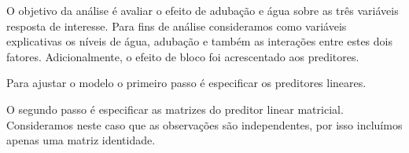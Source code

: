 \begin{knitrout}
\color{fgcolor}\begin{kframe}
\begin{alltt}
\hlstd{(}\hlstd{,}  \hlstd{=} \hlstd{)}
\end{alltt}
\end{kframe}
\end{knitrout}

O objetivo da análise é avaliar o efeito de adubação e água sobre as três variáveis resposta de interesse. Para fins de análise consideramos como variáveis explicativas os níveis de água, adubação e também as interações entre estes dois fatores. Adicionalmente, o efeito de bloco foi acrescentado aos preditores. 

Para ajustar o modelo o primeiro passo é especificar os preditores lineares.

\begin{knitrout}
\color{fgcolor}\begin{kframe}
\begin{alltt}
 \hlkwb{<-}  \hlopt{~}  \hlopt{+}  \hlopt{*} 
 \hlkwb{<-}  \hlopt{~}  \hlopt{+}  \hlopt{*} 

\hlopt{$} \hlkwb{<-} \hlopt{$} \hlopt{/} \hlopt{$}
 \hlkwb{<-}  \hlopt{~}  \hlopt{+}  \hlopt{*} 
\end{alltt}
\end{kframe}
\end{knitrout}

O segundo passo é especificar as matrizes do preditor linear matricial. Consideramos neste caso que as observações são independentes, por isso incluímos apenas uma matriz identidade.

\begin{knitrout}
\color{fgcolor}\begin{kframe}
\begin{alltt}
 \hlkwb{<-} 
\end{alltt}
\end{kframe}
\end{knitrout}

